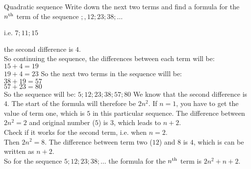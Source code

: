 \begin{wex}{Quadratic sequence}
{Write down the next two terms and find a formula for the $n^{\rm th}$ term of the sequence $;, 12; 23; 38;\ldots$}
{ 
i.e. $7 ; 11; 15$

% 
% 



the second difference is $4$.\\
So continuing the sequence, the differences between each term will be:\\
$15 + 4 = 19$\\
$19 + 4 = 23$
So the next two terms in the sequence willl be:\\
$38 + 19 = 57$\\
$57 + 23 = 80$\\
So the sequence will be:
$5; 12; 23; 38; 57; 80$
We know that the second difference is $4$. The start of the formula will therefore be $2n^2$.
If $n=1$, you have to get the value of term one, which is $5$ in this particular sequence.  The difference between $2n^2 = 2$ and original number ($5$) is $3$, which leads to $n+2$.\\
Check if it works for the second term, i.e. when $n=2$.\\
Then $2n^2=8$.  The difference between term two ($12$) and $8$ is $4$, which is can be written as $n+2$.\\
So for the sequence $5; 12; 23; 38;\ldots$ the formula for the $n^{\rm th}$ term is $2n^2 + n + 2$.
}
\end{wex}


